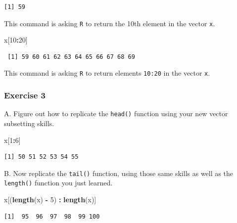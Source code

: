 \documentclass[
]{book}
\newenvironment{Shaded}{\begin{snugshade}}{\end{snugshade}}
\newcommand{\DecValTok}[1]{\textcolor[rgb]{0.00,0.00,0.81}{#1}}
\newcommand{\KeywordTok}[1]{\textcolor[rgb]{0.13,0.29,0.53}{\textbf{#1}}}
\newcommand{\NormalTok}[1]{#1}
\newcommand{\OperatorTok}[1]{\textcolor[rgb]{0.81,0.36,0.00}{\textbf{#1}}}
\newcommand{\StringTok}[1]{\textcolor[rgb]{0.31,0.60,0.02}{#1}}
\begin{document}
\begin{verbatim}
[1] 59
\end{verbatim}

This command is asking \texttt{R} to return the 10th element in the vector \texttt{x}.

\begin{Shaded}
\begin{Highlighting}[]
\NormalTok{x[}\DecValTok{10}\OperatorTok{:}\DecValTok{20}\NormalTok{]}
\end{Highlighting}
\end{Shaded}

\begin{verbatim}
 [1] 59 60 61 62 63 64 65 66 67 68 69
\end{verbatim}

This command is asking \texttt{R} to return elements \texttt{10:20} in the vector \texttt{x}.

\hypertarget{exercise-3-2}{%
\subsubsection*{Exercise 3}\label{exercise-3-2}}

A. Figure out how to replicate the \texttt{head()} function using your new vector subsetting skills.

\begin{Shaded}
\begin{Highlighting}[]
\NormalTok{x[}\DecValTok{1}\OperatorTok{:}\DecValTok{6}\NormalTok{]}
\end{Highlighting}
\end{Shaded}

\begin{verbatim}
[1] 50 51 52 53 54 55
\end{verbatim}

B. Now replicate the \texttt{tail()} function, using those same skills as well as the \texttt{length()} function you just learned.

\begin{Shaded}
\begin{Highlighting}[]
\NormalTok{x[(}\KeywordTok{length}\NormalTok{(x) }\OperatorTok{-}\StringTok{ }\DecValTok{5}\NormalTok{) }\OperatorTok{:}\StringTok{ }\KeywordTok{length}\NormalTok{(x)]}
\end{Highlighting}
\end{Shaded}

\begin{verbatim}
[1]  95  96  97  98  99 100
\end{verbatim}
\end{document}
